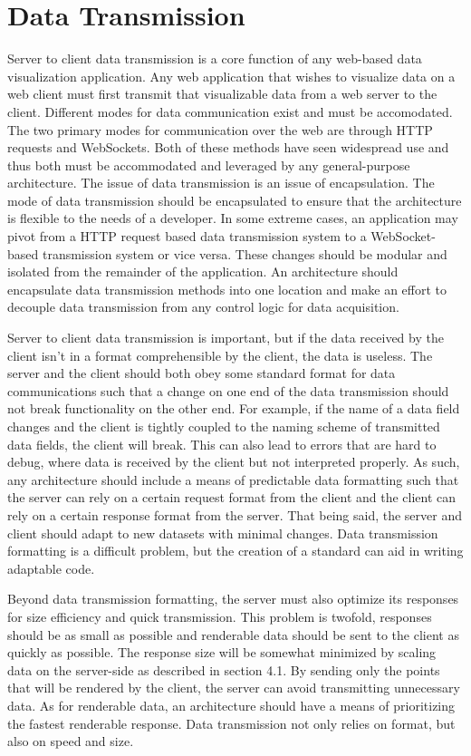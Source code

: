 \section{Data Transmission}
Server to client data transmission is a core function of any web-based data visualization application.  Any web application that wishes to visualize data on a web client must first transmit that visualizable data from a web server to the client. Different modes for data communication exist and must be accomodated.  The two primary modes for communication over the web are through HTTP requests and WebSockets.  Both of these methods have seen widespread use and thus both must be accommodated and leveraged by any general-purpose architecture.  The issue of data transmission is an issue of encapsulation.  The mode of data transmission should be encapsulated to ensure that the architecture is flexible to the needs of a developer.   In some extreme cases, an application may pivot from a HTTP request based data transmission system to a WebSocket-based transmission system or vice versa.  These changes should be modular and isolated from the remainder of the application.  An architecture should encapsulate data transmission methods into one location and make an effort to decouple data transmission from any control logic for data acquisition. \par
Server to client data transmission is important, but if the data received by the client isn’t in a format comprehensible by the client, the data is useless.  The server and the client should both obey some standard format for data communications such that a change on one end of the data transmission should not break functionality on the other end.  For example, if the name of a data field changes and the client is tightly coupled to the naming scheme of transmitted data fields, the client will break.  This can also lead to errors that are hard to debug, where data is received by the client but not interpreted properly.  As such, any architecture should include a means of predictable data formatting such that the server can rely on a certain request format from the client and the client can rely on a certain response format from the server.  That being said, the server and client should adapt to new datasets with minimal changes. Data transmission formatting is a difficult problem, but the creation of a standard can aid in writing adaptable code. \par
Beyond data transmission formatting, the server must also optimize its responses for size efficiency and quick transmission.  This problem is twofold, responses should be as small as possible and renderable data should be sent to the client as quickly as possible.  The response size will be somewhat minimized by scaling data on the server-side as described in section 4.1.  By sending only the points that will be rendered by the client, the server can avoid transmitting unnecessary data.  As for renderable data, an architecture should have a means of prioritizing the fastest renderable response.  Data transmission not only relies on format, but also on speed and size. \par

